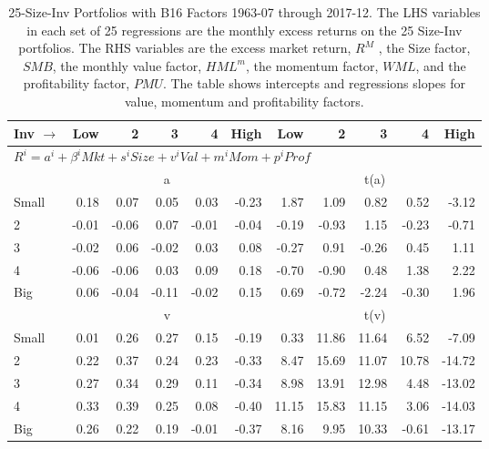 
\begin{table}[!ht]
\footnotesize
\centering
\caption{
\scriptsize{
25-Size-Inv Portfolios with B16 Factors 1963-07 through 2017-12.
The LHS variables in each set of 25 regressions are the monthly excess returns on the 25
Size-Inv portfolios. The RHS variables are the excess market return, $R^M$ , the Size
factor, $SMB$, the monthly value factor, $HML^m$, the momentum factor, $WML$, and the
profitability factor, $PMU$. The table shows intercepts and regressions slopes for value,
momentum and profitability factors.
}
}

\begin{tabular}{lrrrrrrrrrr}
  \toprule
    Inv $\rightarrow$ & Low & 2 & 3 & 4 & High & Low & 2 & 3 & 4 & High \\ 
  \midrule
  \multicolumn{11}{l}{$R^i=a^i+\beta^iMkt+s^iSize+v^iVal+m^iMom+p^iProf$} \\

  
    
      & \multicolumn{5}{c}{a} & \multicolumn{5}{c}{t(a)}
    
    \\
      \cmidrule(r){2-6} \cmidrule(r){7-11}

    Small   & 0.18  & 0.07  & 0.05  & 0.03  & -0.23  & 1.87  & 1.09  & 0.82  & 0.52  & -3.12  \\
         2  & -0.01  & -0.06  & 0.07  & -0.01  & -0.04  & -0.19  & -0.93  & 1.15  & -0.23  & -0.71  \\
         3  & -0.02  & 0.06  & -0.02  & 0.03  & 0.08  & -0.27  & 0.91  & -0.26  & 0.45  & 1.11  \\
         4  & -0.06  & -0.06  & 0.03  & 0.09  & 0.18  & -0.70  & -0.90  & 0.48  & 1.38  & 2.22  \\
    Big     & 0.06  & -0.04  & -0.11  & -0.02  & 0.15  & 0.69  & -0.72  & -2.24  & -0.30  & 1.96  \\

  
    
      & \multicolumn{5}{c}{v} & \multicolumn{5}{c}{t(v)}
    
    \\
      \cmidrule(r){2-6} \cmidrule(r){7-11}

    Small   & 0.01  & 0.26  & 0.27  & 0.15  & -0.19  & 0.33  & 11.86  & 11.64  & 6.52  & -7.09  \\
         2  & 0.22  & 0.37  & 0.24  & 0.23  & -0.33  & 8.47  & 15.69  & 11.07  & 10.78  & -14.72  \\
         3  & 0.27  & 0.34  & 0.29  & 0.11  & -0.34  & 8.98  & 13.91  & 12.98  & 4.48  & -13.02  \\
         4  & 0.33  & 0.39  & 0.25  & 0.08  & -0.40  & 11.15  & 15.83  & 11.15  & 3.06  & -14.03  \\
    Big     & 0.26  & 0.22  & 0.19  & -0.01  & -0.37  & 8.16  & 9.95  & 10.33  & -0.61  & -13.17  \\


\end{tabular}
\end{table}
